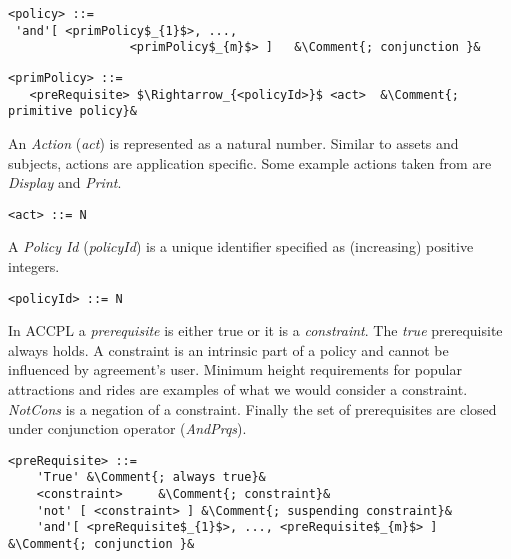 \lstset{mathescape, language=AST, escapechar=\&}  
\begin{lstlisting}[frame=single, caption={policy},label={lst:policyast}]
<policy> ::=  
 'and'[ <primPolicy$_{1}$>, ..., 
                 <primPolicy$_{m}$> ]	&\Comment{; conjunction }&
\end{lstlisting}


\lstset{mathescape, language=AST, escapechar=\&}  
\begin{lstlisting}[frame=single, caption={primPolicy},label={lst:primPolicyast}]
<primPolicy> ::=  
   <preRequisite> $\Rightarrow_{<policyId>}$ <act> 	&\Comment{; primitive policy}&
\end{lstlisting}

An \emph{Action} (\emph{act}) is represented as a natural number. Similar to assets and subjects, actions are application specific. Some example actions taken from \cite{pucella2006} are \emph{Display} and \emph{Print}.

\lstset{mathescape, language=AST}  
\begin{lstlisting}[frame=single, caption={act},label={lst:actast}]
<act> ::= N
\end{lstlisting}

A \emph{Policy Id} (\emph{policyId}) is a unique identifier specified as (increasing) positive integers. 

\lstset{mathescape, language=AST}  
\begin{lstlisting}[frame=single, caption={policyId},label={lst:policyIdast}]
<policyId> ::= N
\end{lstlisting}

In \ac{ACCPL} a \emph{prerequisite} is either true or it is a \emph{constraint}. The \emph{true} prerequisite always holds. A constraint is an intrinsic part of a policy and cannot be influenced by agreement's user. Minimum height requirements for popular attractions and rides are examples of what we would consider a constraint. \emph{NotCons} is a negation of a constraint. Finally the set of prerequisites are closed under conjunction operator (\emph{AndPrqs}).


\lstset{mathescape, language=AST, escapechar=\&}  
\begin{lstlisting}[frame=single, caption={preRequisite},label={lst:preRequisiteast}]
<preRequisite> ::=  
	'True' &\Comment{; always true}&
	<constraint>	 &\Comment{; constraint}&
	'not' [ <constraint> ] &\Comment{; suspending constraint}&
	'and'[ <preRequisite$_{1}$>, ..., <preRequisite$_{m}$> ] &\Comment{; conjunction }&
\end{lstlisting}

